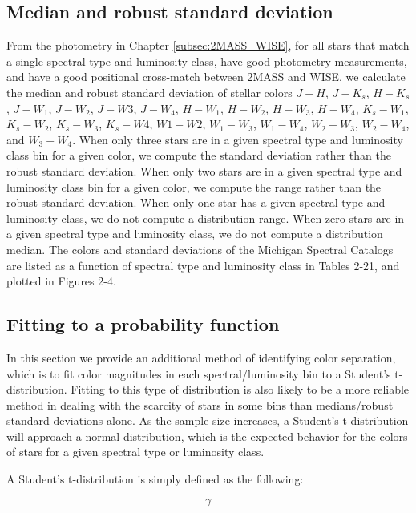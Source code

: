 \subsection{Median and robust standard deviation} \label{subsec:median_stats}
From the photometry in Chapter \ref{subsec:2MASS_WISE}, for all stars that match a single spectral type and luminosity class, have good photometry measurements, and have a good positional cross-match between 2MASS and WISE, we calculate the median and robust standard deviation of stellar colors $J-H$, $J-K_s$, $H-K_s$, $J-W_1$, $J-W_2$, $J-W3$, $J-W_4$, $H-W_1$, $H-W_2$, $H-W_3$, $H-W_4$, $K_s-W_1$, $K_s-W_2$, $K_s-W_3$, $K_s-W4$, $W1-W2$, $W_1-W_3$, $W_1-W_4$, $W_2-W_3$, $W_2-W_4$, and $W_3-W_4$.  When only three stars are in a given spectral type and luminosity class bin for a given color, we compute the standard deviation rather than the robust standard deviation.  When only two stars are in a given spectral type and luminosity class bin for a given color, we compute the range rather than the robust standard deviation.  When only one star has a given spectral type and luminosity class, we do not compute a distribution range.  When zero stars are in a given spectral type and luminosity class, we do not compute a distribution median.  The colors and standard deviations of the Michigan Spectral Catalogs are listed as a function of spectral type and luminosity class in Tables 2-21, and plotted in Figures 2-4.

\subsection{Fitting to a probability function} \label{subsec:tdist_stats}
In this section we provide an additional method of identifying color separation, which is to fit color magnitudes in each spectral/luminosity bin to a Student's t-distribution. Fitting to this type of distribution is also likely to be a more reliable method in dealing with the scarcity of stars in some bins than medians/robust standard deviations alone. As the sample size increases, a Student's t-distribution will approach a normal distribution, which is the expected behavior for the colors of stars for a given spectral type or luminosity class.

A Student's t-distribution is simply defined as the following:

\begin{equation} \label{eq:students-t}
   \gamma 
\end{equation}

